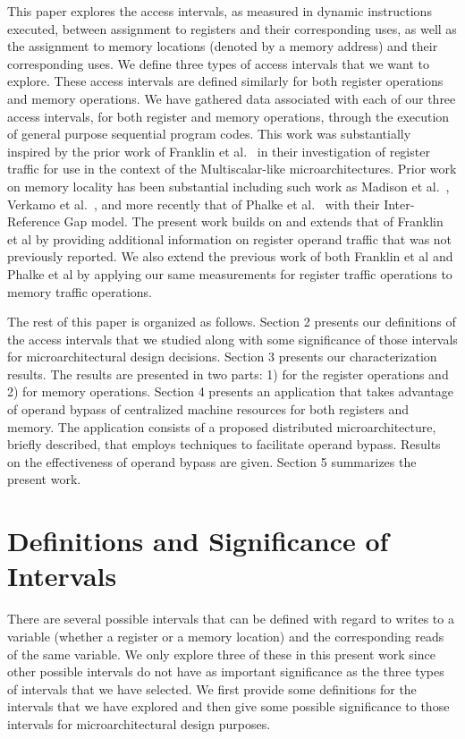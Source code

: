 \documentclass[10pt,dvips]{article}
\begin{document}
This paper explores the access intervals, as measured in dynamic 
instructions executed, between assignment to
registers and their corresponding uses, as well as the
assignment to memory locations (denoted by a memory address) and their 
corresponding uses.
We define three types of access intervals that we want to explore.
These access intervals are defined similarly for both register 
operations and
memory operations.
We have gathered data associated with each of our three access
intervals, for both register and memory operations, 
through the execution of general purpose sequential
program codes.
This work was substantially inspired by the prior work 
of Franklin et al.~\cite{Franklin92}
in their investigation of register traffic
for use in the context of the Multiscalar-like microarchitectures.
Prior work on memory locality has been substantial including
such work as Madison et al.~\cite{madison76characteristics},
Verkamo et al.~\cite{verkamo85emperical}, and more recently
that of Phalke et al.~\cite{phalke95gap} with their Inter-Reference
Gap model.
The present work builds on and extends that of Franklin et al
by providing
additional information on register operand traffic that was not
previously reported.
We also extend the previous work of both Franklin et al and 
Phalke et al by applying our same measurements for register traffic
operations to memory traffic operations.

The rest of this paper is organized as follows.
Section 2 presents our definitions of the access intervals that
we studied along with some significance of those intervals
for microarchitectural design
decisions.
Section 3 presents our characterization results.
The results are presented in two parts:  
1) for the register
operations and 2) for memory operations.
Section 4 presents an application that takes advantage
of operand bypass of centralized machine resources for both registers 
and memory.
The application consists of a proposed distributed microarchitecture,
briefly described,
that employs techniques to facilitate operand bypass.
Results on the effectiveness of operand bypass are given.
Section 5 summarizes the present work.
%
\section{Definitions and Significance of Intervals}
%
There are several possible intervals that can be defined with
regard to writes to a variable (whether a register or a memory
location) and the corresponding reads of the same variable.
We only explore three of these in this present work since
other possible intervals do not have as important significance
as the three types of intervals that we have selected.
We first provide some definitions for the intervals that
we have explored and then give some possible significance
to those intervals for microarchitectural design purposes.
%
\end{document}
